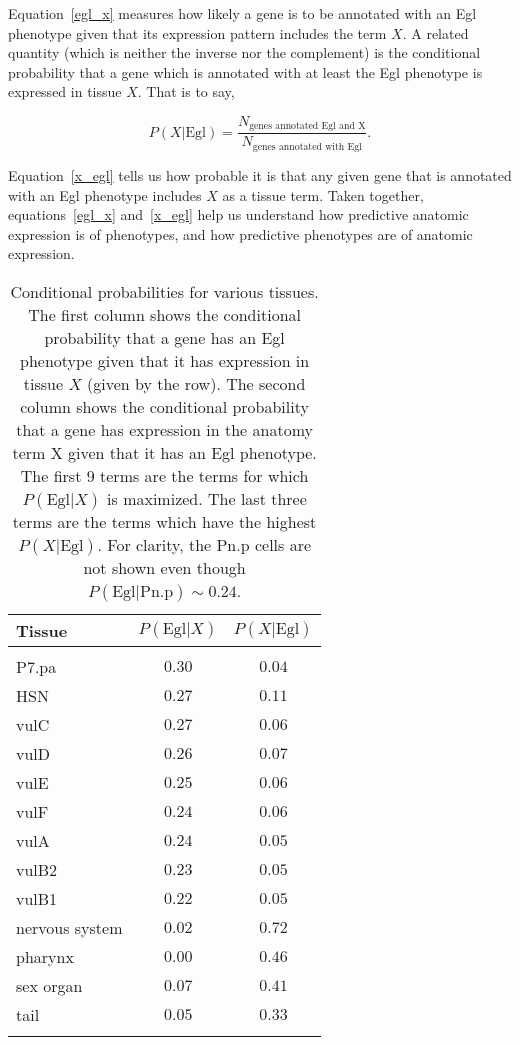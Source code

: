 Equation~\ref{egl_x} measures how likely a gene is to be annotated with an Egl
phenotype given that its expression pattern includes the term $X$. A related
quantity (which is neither the inverse nor the complement) is the conditional
probability that a gene which is annotated with at least the Egl phenotype is
expressed in tissue $X$. That is to say,

\begin{equation}
  P(X|\text{Egl}) = \frac{N_\text{genes annotated Egl and X}}
                         {N_\text{genes annotated with Egl}}.
  \label{x_egl}
\end{equation}

Equation~\ref{x_egl} tells us how probable it is that any given gene that is
annotated with an Egl phenotype includes $X$ as a tissue term. Taken together,
equations~\ref{egl_x} and~\ref{x_egl} help us understand how predictive
anatomic expression is of phenotypes, and how predictive phenotypes are of
anatomic expression.

\begin{table*}
  \renewcommand{\familydefault}{\sfdefault}\normalfont{}
  \centering{}
  \caption{Conditional probabilities for various tissues. The
  first column shows the conditional probability that a gene has an Egl
  phenotype given that it has expression in tissue $X$ (given by the row).
  The second column shows the conditional probability that a gene has expression
  in the anatomy term X given that it has an Egl phenotype. The first 9 terms
  are the terms for which $P(\text{Egl}|X)$ is maximized. The last three terms
  are the terms which have the highest $P(X|\text{Egl})$. For clarity, the Pn.p
  cells are not shown even though $P(\text{Egl}|\text{Pn.p})\sim 0.24$.}

  \begin{tabular}{@{}lcc@{}}
  \toprule{}
  Tissue & $P(\text{Egl}| X)$ & $P(X|\text{Egl})$\\
  \bottomrule{}\\
  P7.pa & $0.30$ & $0.04$\\
  HSN & $0.27$ & $0.11$\\
  vulC & $0.27$ & $0.06$\\
  vulD & $0.26$ & $0.07$\\
  vulE & $0.25$ & $0.06$\\
  vulF & $0.24$ & $0.06$\\
  vulA & $0.24$ & $0.05$\\
  vulB2 & $0.23$ & $0.05$\\
  vulB1 & $0.22$ & $0.05$\\
  nervous system & $0.02$ & $0.72$ \\
  pharynx  & $0.00$ & $0.46$\\
  sex organ & $0.07$ & $0.41$\\
  tail & $0.05$ & $0.33$\\
  \bottomrule{}
  \end{tabular}
\label{tab:cond_probs}
\end{table*}

